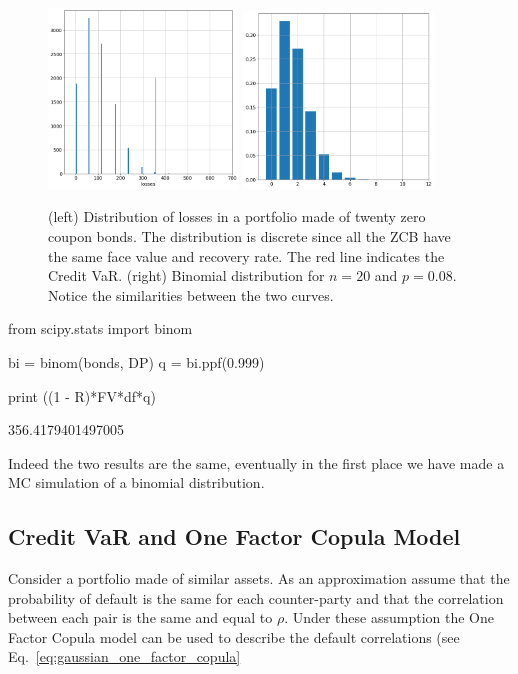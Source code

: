 \begin{figure}[htb]
\centering
\includegraphics[width=0.45\textwidth]{figures/credit_var_zcb}
\includegraphics[width=0.45\textwidth]{figures/binomial_zcb}
\caption{(left) Distribution of losses in a portfolio made of twenty zero coupon bonds. The distribution is discrete since all the ZCB have the same face value and recovery rate. The red line indicates the Credit VaR. (right) 
Binomial distribution for $n=20$ and $p=0.08$. Notice the similarities between the two curves.}
\label{fig:credit_var}
\end{figure}

\begin{ipython}
from scipy.stats import binom

bi = binom(bonds, DP)
q = bi.ppf(0.999)

print ((1 - R)*FV*df*q)
\end{ipython}
\begin{ioutput}
356.4179401497005
\end{ioutput}

Indeed the two results are the same, eventually in the first place we have made a MC simulation of a binomial distribution.

\subsection{Credit VaR and One Factor Copula Model}
Consider a portfolio made of similar assets. As an approximation assume that the probability of default is the same for each counter-party and that the correlation between each pair is the same and equal to $\rho$. Under these assumption the One Factor Copula model can be used to describe the default correlations (see Eq.~\ref{eq:gaussian_one_factor_copula}

